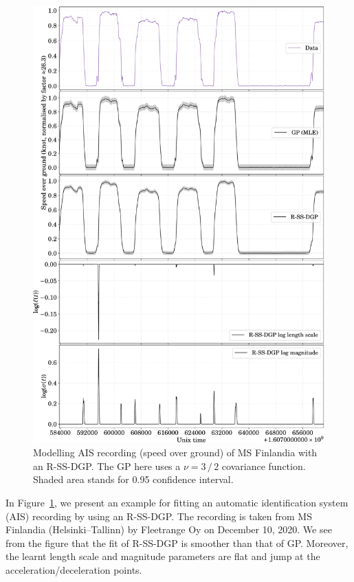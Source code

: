 \begin{figure}[t!]
	\centering
	\includegraphics[width=.99\linewidth]{figs/ais-r-ssdgp}
	\caption{Modelling AIS recording (speed over ground) of MS Finlandia with an R-SS-DGP. The GP here uses a \matern $\nu=3\,/\,2$ covariance function. Shaded area stands for 0.95 confidence interval.}
	\label{fig:ais-ssdgp}
\end{figure}

In Figure~\ref{fig:ais-ssdgp}, we present an example for fitting an automatic identification system (AIS) recording by using an R-SS-DGP. The recording is taken from MS Finlandia (Helsinki--Tallinn) by Fleetrange Oy on December 10, 2020. We see from the figure that the fit of R-SS-DGP is smoother than that of GP. Moreover, the learnt length scale and magnitude parameters are flat and jump at the acceleration/deceleration points.
